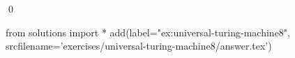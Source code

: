 
\begin{ex} 
  \label{ex:universal-turing-machine8}
  
  \qed
\end{ex} 
\begin{python0}
from solutions import *
add(label="ex:universal-turing-machine8",
    srcfilename='exercises/universal-turing-machine8/answer.tex') 
\end{python0}
